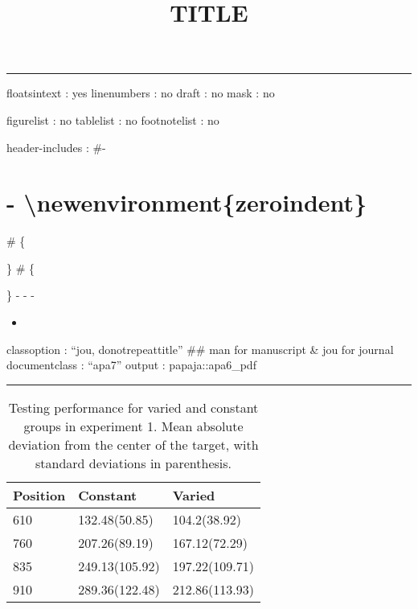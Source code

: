 \documentclass[
  jou, donotrepeattitle,floatsintext]{article}
\title{TITLE}
\author{\phantom{0}}
\date{}
\affiliation{\phantom{0}}
\begin{document}
\maketitle

\begin{center}\rule{0.5\linewidth}{0.5pt}\end{center}

floatsintext : yes
linenumbers : no
draft : no
mask : no

figurelist : no
tablelist : no
footnotelist : no

header-includes :
\#-

\usepackage{setspace}\singlespacing

\hypertarget{newenvironmentzeroindent}{%
\section{- \textbackslash newenvironment\{zeroindent\}}\label{newenvironmentzeroindent}}

\# \{

\par

\setlength{\parindent}{5pt}\}
\# \{

\par

\}
- \setlength{\parskip}{0pt}
- \raggedbottom
-

\usepackage{caption}

\begin{itemize}
\item
\end{itemize}

classoption : ``jou, donotrepeattitle'' \#\# man for manuscript \& jou for journal
documentclass : ``apa7''
output : papaja::apa6\_pdf

\begin{center}\rule{0.5\linewidth}{0.5pt}\end{center}



\begin{table}

\caption{\label{tab:e1Table}Testing performance for varied and constant groups in experiment 1. Mean absolute deviation from the center of the target, with standard deviations in parenthesis.}
\begin{tabular}[t]{lll}
\toprule
Position & Constant & Varied\\
\midrule
610 & 132.48(50.85) & 104.2(38.92)\\
760 & 207.26(89.19) & 167.12(72.29)\\
835 & 249.13(105.92) & 197.22(109.71)\\
910 & 289.36(122.48) & 212.86(113.93)\\
\bottomrule
\end{tabular}
\end{table}
\end{document}
